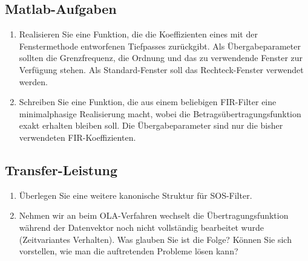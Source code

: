 {
\subsection{Matlab-Aufgaben}
\begin{enumerate}
    \item Realisieren Sie eine Funktion, die die Koeffizienten eines mit der Fenstermethode
    entworfenen Tiefpasses zurückgibt. Als Übergabeparameter sollten die Grenzfrequenz, die Ordnung und das
    zu verwendende Fenster zur Verfügung stehen. Als Standard-Fenster soll das Rechteck-Fenster
    verwendet werden.
    \item Schreiben Sie eine Funktion, die aus einem beliebigen FIR-Filter eine minimalphasige
    Realisierung macht, wobei die Betragsübertragungsfunktion exakt erhalten bleiben soll.
    Die Übergabeparameter sind nur die bisher verwendeten FIR-Koeffizienten.
\end{enumerate}
}{}
\subsection{Transfer-Leistung}
\begin{enumerate}
    \item Überlegen Sie eine weitere kanonische Struktur für SOS-Filter.
    \item Nehmen wir an beim OLA-Verfahren wechselt die Übertragungsfunktion
    während der Datenvektor noch nicht vollständig bearbeitet wurde (Zeitvariantes Verhalten).
    Was glauben Sie ist die Folge? Können Sie sich vorstellen, wie man die auftretenden
    Probleme lösen kann?
\end{enumerate}

